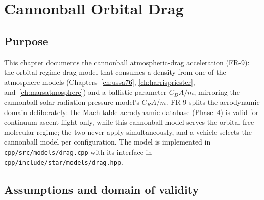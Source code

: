\chapter{Cannonball Orbital Drag}
\label{ch:drag}

\section{Purpose}
\label{sec:drag:purpose}

This chapter documents the cannonball atmospheric-drag acceleration
(FR-9): the orbital-regime drag model that consumes a density from one of
the atmosphere models (Chapters~\ref{ch:ussa76},
\ref{ch:harrispriester}, and~\ref{ch:marsatmosphere}) and a ballistic
parameter $C_D A / m$, mirroring the cannonball solar-radiation-pressure
model's $C_R A / m$. FR-9 splits the aerodynamic domain deliberately: the
Mach-table aerodynamic database (Phase~4) is valid for continuum ascent
flight only, while this cannonball model serves the orbital free-molecular
regime; the two never apply simultaneously, and a vehicle selects the
cannonball model per configuration. The model is implemented in
\texttt{cpp/src/models/drag.cpp} with its interface in
\texttt{cpp/include/star/models/drag.hpp}.

\section{Assumptions and domain of validity}
\label{sec:drag:domain}

